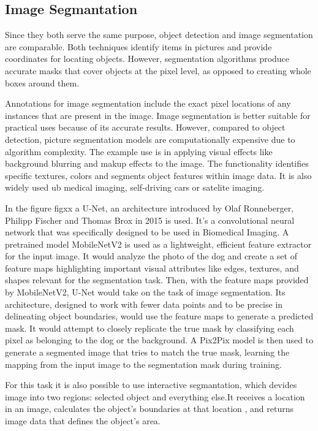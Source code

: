 	

	\subsection*{Image Segmantation}

	Since they both serve the same purpose, object detection and image segmentation are comparable. Both techniques identify items in pictures and provide coordinates for locating objects. However, segmentation algorithms produce accurate masks that cover objects at the pixel level, as opposed to creating whole boxes around them.
	
	Annotations for image segmentation include the exact pixel locations of any instances that are present in the image. Image segmentation is better suitable for practical uses because of its accurate results. However, compared to object detection, picture segmentation models are computationally expensive due to algorithm complexity.
	The example use is in applying  visual effects like background blurring and makup effects to the image. The functionality identifies specific textures, colors and segments object features within image data. It is also widely used ub medical imaging, self-driving cars or satelite imaging. 
	
In the figure figxx a U-Net, an architecture introduced by Olaf Ronneberger, Philipp Fischer and Thomas Brox in 2015 is used. It's a convolutional neural network that was specifically designed to be used in Biomedical Imaging. A pretrained model MobileNetV2 is used as a lightweight, efficient feature extractor for the input image. It would analyze the photo of the dog and create a set of feature maps highlighting important visual attributes like edges, textures, and shapes relevant for the segmentation task. Then, with the feature maps provided by MobileNetV2, U-Net would take on the task of image segmentation. Its architecture, designed to work with fewer data points and to be precise in delineating object boundaries, would use the feature maps to generate a predicted mask. It would attempt to closely replicate the true mask by classifying each pixel as belonging to the dog or the background. A Pix2Pix model is then used to generate a segmented image that tries to match the true mask, learning the mapping from the input image to the segmentation mask during training.
	
	For this task it is also possible to use interactive segmantation, which devides image into two regions: selected object and everything else.It receives a location in an image, calculates the object's boundaries at that location , and returns image data that defines the object's area. 



